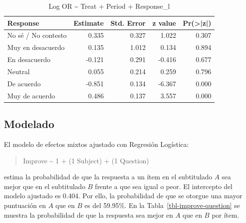 \documentclass[
  12pt,
  a4paper,
  extrafontsizes,
  onecolumn,
  openright,
  table]{memoir}
\begin{document}
\hypertarget{tbl-logor2}{}
\begin{longtable}{lrrrr}
\caption{\label{tbl-logor2}Log OR \textasciitilde{} Treat + Period + Response\_l }\tabularnewline

\toprule
Response & Estimate & Std. Error & z value & Pr(>|z|) \\ 
\midrule
No sé / No contesto & 0.335 & 0.327 & 1.022 & 0.307 \\ 
Muy en desacuerdo & 0.135 & 1.012 & 0.134 & 0.894 \\ 
En desacuerdo & -0.121 & 0.291 & -0.416 & 0.677 \\ 
Neutral & 0.055 & 0.214 & 0.259 & 0.796 \\ 
De acuerdo & -0.851 & 0.134 & -6.367 & 0.000 \\ 
Muy de acuerdo & 0.486 & 0.137 & 3.557 & 0.000 \\ 
\bottomrule
\end{longtable}

\hypertarget{modelado}{%
\subsection{Modelado}\label{modelado}}

El modelo de efectos mixtos ajustado con Regresión Logística:

\begin{quote}
Improve \textasciitilde{} 1 + (1 \textbar{} Subject) + (1 \textbar{}
Question)
\end{quote}

estima la probabilidad de que la respuesta a un ítem en el subtitulado
\(A\) sea mejor que en el subtitulado \(B\) frente a que sea igual o
peor. El intercepto del modelo ajustado es 0.404. Por ello, la
probabilidad de que se otorgue una mayor puntuación en \(A\) que en
\(B\) es del 59.95\%. En la Tabla~\ref{tbl-improve-question} se muestra
la probabilidad de que la respuesta sea mejor en \(A\) que en \(B\) por
ítem.

\scriptsize
\end{document}
